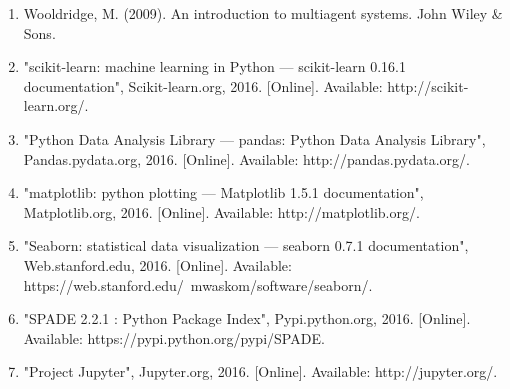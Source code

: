 \documentclass[prodmode,acmtecs]{acmsmall} %
\begin{document}
\begin{enumerate}
\item Wooldridge, M. (2009). An introduction to multiagent systems. John Wiley \& Sons.

\item "scikit-learn: machine learning in Python — scikit-learn 0.16.1 documentation", Scikit-learn.org, 2016. [Online]. Available: http://scikit-learn.org/.

\item "Python Data Analysis Library — pandas: Python Data Analysis Library", Pandas.pydata.org, 2016. [Online]. Available: http://pandas.pydata.org/.

\item "matplotlib: python plotting — Matplotlib 1.5.1 documentation", Matplotlib.org, 2016. [Online]. Available: http://matplotlib.org/.

\item "Seaborn: statistical data visualization — seaborn 0.7.1 documentation", Web.stanford.edu, 2016. [Online]. Available: https://web.stanford.edu/~mwaskom/software/seaborn/.

\item "SPADE 2.2.1 : Python Package Index", Pypi.python.org, 2016. [Online]. Available: https://pypi.python.org/pypi/SPADE.

\item "Project Jupyter", Jupyter.org, 2016. [Online]. Available: http://jupyter.org/.

\end{enumerate}

\end{document}
